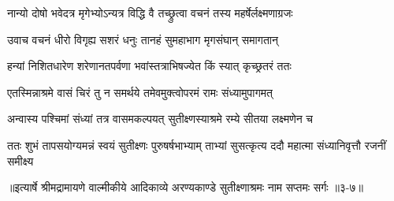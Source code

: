 \twolineshloka
{नान्यो दोषो भवेदत्र मृगेभ्योऽन्यत्र विद्धि वै}
{तच्छ्रुत्वा वचनं तस्य महर्षेर्लक्ष्मणाग्रजः} %

\twolineshloka
{उवाच वचनं धीरो विगृह्य सशरं धनुः}
{तानहं सुमहाभाग मृगसंघान् समागतान्} %

\twolineshloka
{हन्यां निशितधारेण शरेणानतपर्वणा}
{भवांस्तत्राभिषज्येत किं स्यात् कृच्छ्रतरं ततः} %

\twolineshloka
{एतस्मिन्नाश्रमे वासं चिरं तु न समर्थये}
{तमेवमुक्त्वोपरमं रामः संध्यामुपागमत्} %

\twolineshloka
{अन्वास्य पश्चिमां संध्यां तत्र वासमकल्पयत्}
{सुतीक्ष्णस्याश्रमे रम्ये सीतया लक्ष्मणेन च} %

\twolineshloka
{ततः शुभं तापसयोग्यमन्नं स्वयं सुतीक्ष्णः पुरुषर्षभाभ्याम्}
{ताभ्यां सुसत्कृत्य ददौ महात्मा संध्यानिवृत्तौ रजनीं समीक्ष्य} %


॥इत्यार्षे श्रीमद्रामायणे वाल्मीकीये आदिकाव्ये अरण्यकाण्डे सुतीक्ष्णाश्रमः नाम सप्तमः सर्गः ॥३-७॥
